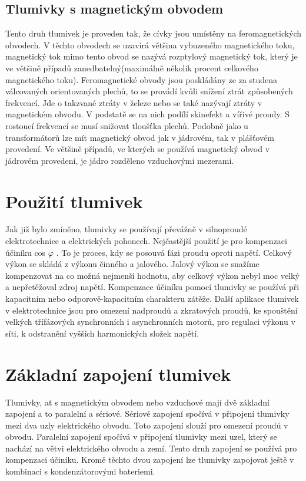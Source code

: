 \subsection{Tlumivky s magnetickým obvodem}
Tento druh tlumivek je proveden tak, že cívky jsou umístěny na feromagnetických obvodech. V těchto obvodech se uzavírá většina vybuzeného magnetického toku, magnetický tok mimo tento obvod se nazývá rozptylový magnetický tok, který je ve většině případů zanedbatelný(maximálně několik procent celkového magnetického toku). Feromagnetické obvody jsou poskládány ze za studena válcovaných orientovaných plechů, to se provádí kvůli snížení ztrát způsobených frekvencí. Jde o takzvané ztráty v železe nebo se také nazývají ztráty v magnetickém obvodu. V podstatě se na nich podílí skinefekt a vířivé proudy. S rostoucí frekvencí se musí snižovat tloušťka plechů. Podobně jako u transformátorů lze mít magnetický obvod jak v jádrovém, tak v plášťovém provedení. Ve většině případů, ve kterých se používá magnetický obvod v jádrovém provedení, je jádro rozděleno vzduchovými mezerami.
\section{Použití tlumivek}
Jak již bylo zmíněno, tlumivky se používají převážně v silnoproudé elektrotechnice a elektrických pohonech. Nejčastější použití je pro kompenzaci účiníku cos $\varphi$ . To je proces, kdy se posouvá fázi proudu oproti napětí. Celkový výkon se skládá z výkonu činného a jalového. Jalový výkon se snažíme kompenzovat na co možná nejmenší hodnotu, aby celkový výkon nebyl moc velký a nepřetěžoval zdroj napětí. Kompenzace účiníku pomocí tlumivky se používá při kapacitním nebo odporově-kapacitním charakteru zátěže. Další aplikace tlumivek v elektrotechnice jsou pro omezení nadproudů a zkratových proudů, ke spouštění velkých třífázových synchronních i asynchronních motorů, pro regulaci výkonu v síti, k odstranění vyšších harmonických složek napětí.
\section{Základní zapojení tlumivek} Tlumivky, ať s magnetickým obvodem nebo vzduchové mají dvě základní zapojení a to paralelní a sériové. Sériové zapojení spočívá v připojení tlumivky mezi dva uzly elektrického obvodu. Toto zapojení slouží pro omezení proudů v obvodu. Paralelní zapojení spočívá  v připojení tlumivky mezi uzel, který se nachází na větvi elektrického obvodu a zemí. Tento druh zapojení se používá pro kompenzaci účiníku. Kromě těchto dvou zapojení lze tlumivky zapojovat ještě v kombinaci s kondenzátorovými bateriemi.